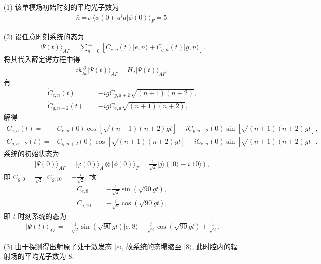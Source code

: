 \documentclass{assignment}
\begin{document}
\begin{sol}
    \begin{itemize}
        \item[(1)] 该单模场初始时刻的平均光子数为
        \begin{align}
            \bar{n}=_F\langle\phi(0)\rvert a^{\dagger}a\lvert\phi(0)\rangle_F=5.
        \end{align}
        \item[(2)] 设任意时刻系统的态为
        \begin{align}
            \lvert\Psi(t)\rangle_{AF}=\sum_{n=0}^{\infty}[C_{e,n}(t)\lvert e,n\rangle+C_{g,n}(t)\lvert g,n\rangle].
        \end{align}
        将其代入薛定谔方程中得
        \begin{align}
            i\hbar\frac{\partial}{\partial t}\lvert\Psi(t)\rangle_{AF}=H_I\lvert\Psi(t)\rangle_{AF},
        \end{align}
        有
        \begin{align}
            \dot{C}_{e,n}(t)=&-igC_{g,n+2}\sqrt{(n+1)(n+2)},\\
            \dot{C}_{g,n+2}(t)=&-igC_{e,n}\sqrt{(n+1)(n+2)},
        \end{align}
        解得
        \begin{align}
            C_{e,n}(t)=&C_{e,n}(0)\cos[\sqrt{(n+1)(n+2)}gt]-iC_{g,n+2}(0)\sin[\sqrt{(n+1)(n+2)}gt],\\
            C_{g,n+2}(t)=&C_{g,n+2}(0)\cos[\sqrt{(n+1)(n+2)}gt]-iC_{e,n}(0)\sin[\sqrt{(n+1)(n+2)}gt].
        \end{align}
        系统的初始状态为
        \begin{align}
            \lvert\Psi(0)\rangle_{AF}=\lvert\varphi(0)\rangle_A\otimes\lvert\phi(0)\rangle_F=\frac{1}{\sqrt{2}}\lvert g\rangle(\lvert 0\rangle-i\lvert 10\rangle),
        \end{align}
        即 $C_{g,0}=\frac{1}{\sqrt{2}}$, $C_{g,10}=-\frac{i}{\sqrt{2}}$, 故
        \begin{align}
            C_{e,8}=&-\frac{1}{\sqrt{2}}\sin(\sqrt{90}gt),\\
            C_{g,10}=&-\frac{i}{\sqrt{2}}\cos(\sqrt{90}gt),
        \end{align}
        即 $t$ 时刻系统的态为
        \begin{align}
            \lvert\Psi(t)\rangle_{AF}=-\frac{1}{\sqrt{2}}\sin(\sqrt{90}gt)\lvert e,8\rangle-\frac{i}{\sqrt{2}}\cos(\sqrt{90}gt)+\frac{1}{\sqrt{2}}.
        \end{align}
        \item[(3)] 由于探测得出射原子处于激发态 $\lvert e\rangle$, 故系统的态塌缩至 $\lvert 8\rangle$, 此时腔内的辐射场的平均光子数为 $8$.
    \end{itemize}
\end{sol}
\end{document}

